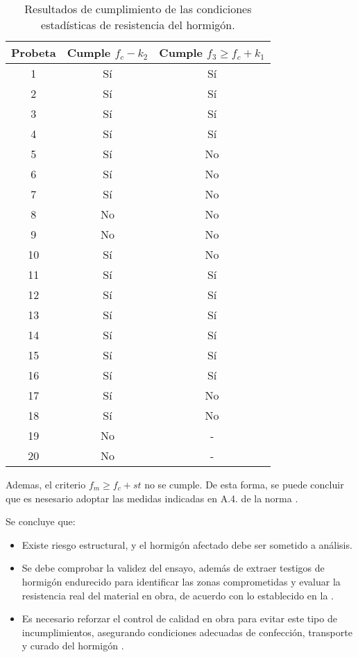 \begin{table}[H]
\centering
\begin{tabular}{|c|c|c|}
\hline
\textbf{Probeta} & \textbf{Cumple $f_c - k_2$} & \textbf{Cumple $f_3 \geq f_c + k_1$} \\ \hline
1  & Sí & Sí \\ \hline
2  & Sí & Sí \\ \hline
3  & Sí & Sí \\ \hline
4  & Sí & Sí \\ \hline
5  & Sí & No \\ \hline
6  & Sí & No \\ \hline
7  & Sí & No \\ \hline
8  & No & No \\ \hline
9  & No & No \\ \hline
10 & Sí & No \\ \hline
11 & Sí & Sí \\ \hline
12 & Sí & Sí \\ \hline
13 & Sí & Sí \\ \hline
14 & Sí & Sí \\ \hline
15 & Sí & Sí \\ \hline
16 & Sí & Sí \\ \hline
17 & Sí & No \\ \hline
18 & Sí & No \\ \hline
19 & No & - \\ \hline
20 & No & - \\ \hline
\end{tabular}
\caption{Resultados de cumplimiento de las condiciones estadísticas de resistencia del hormigón.}
\label{tab:cumplimiento}
\end{table}

Ademas, el criterio $f_m \geq f_c + st$ no se cumple. De esta forma, se puede concluir que es nesesario adoptar las medidas indicadas en A.4. de la norma \cite{NCh1998}.

Se concluye que:

\begin{itemize}
    \item Existe riesgo estructural, y el hormigón afectado debe ser sometido a análisis.
    \item Se debe comprobar la validez del ensayo, además de extraer testigos de hormigón endurecido para identificar las zonas comprometidas y evaluar la resistencia real del material en obra, de acuerdo con lo establecido en la \citep{NCh1171-1-2001,NCh1171-2-2001}.
    \item Es necesario reforzar el control de calidad en obra para evitar este tipo de incumplimientos, asegurando condiciones adecuadas de confección, transporte y curado del hormigón \citep{NCh170-2016}.
\end{itemize}

